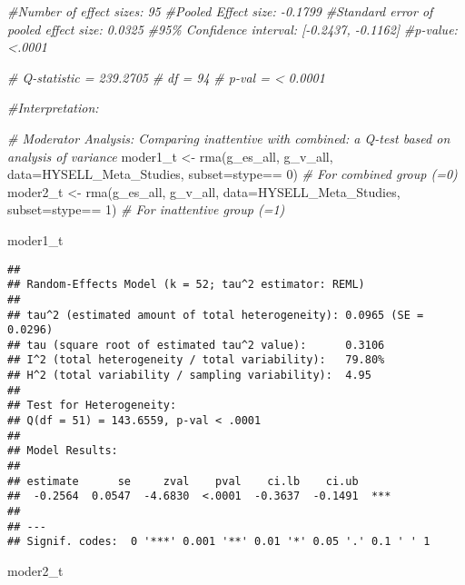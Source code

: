 \documentclass[
]{book}
\newenvironment{Shaded}{\begin{snugshade}}{\end{snugshade}}
\newcommand{\AttributeTok}[1]{\textcolor[rgb]{0.77,0.63,0.00}{#1}}
\newcommand{\CommentTok}[1]{\textcolor[rgb]{0.56,0.35,0.01}{\textit{#1}}}
\newcommand{\DecValTok}[1]{\textcolor[rgb]{0.00,0.00,0.81}{#1}}
\newcommand{\FunctionTok}[1]{\textcolor[rgb]{0.00,0.00,0.00}{#1}}
\newcommand{\NormalTok}[1]{#1}
\newcommand{\OtherTok}[1]{\textcolor[rgb]{0.56,0.35,0.01}{#1}}
\newcommand{\SpecialCharTok}[1]{\textcolor[rgb]{0.00,0.00,0.00}{#1}}
\begin{document}
\begin{Shaded}
\begin{Highlighting}[]
\CommentTok{\#Number of effect sizes: 95}
\CommentTok{\#Pooled Effect size: {-}0.1799}
\CommentTok{\#Standard error of pooled effect size:  0.0325}
\CommentTok{\#95\% Confidence interval: [{-}0.2437, {-}0.1162]}
\CommentTok{\#p{-}value: \textless{}.0001}

\CommentTok{\# Q{-}statistic = 239.2705}
\CommentTok{\# df = 94}
\CommentTok{\# p{-}val = \textless{} 0.0001}

\CommentTok{\#Interpretation: }



\CommentTok{\# Moderator Analysis: Comparing inattentive with combined: a Q{-}test based on analysis of variance}
\NormalTok{moder1\_t }\OtherTok{\textless{}{-}} \FunctionTok{rma}\NormalTok{(g\_es\_all, g\_v\_all, }\AttributeTok{data=}\NormalTok{HYSELL\_Meta\_Studies, }\AttributeTok{subset=}\NormalTok{stype}\SpecialCharTok{==} \DecValTok{0}\NormalTok{) }\CommentTok{\# For combined group (=0)}
\NormalTok{moder2\_t }\OtherTok{\textless{}{-}} \FunctionTok{rma}\NormalTok{(g\_es\_all, g\_v\_all, }\AttributeTok{data=}\NormalTok{HYSELL\_Meta\_Studies, }\AttributeTok{subset=}\NormalTok{stype}\SpecialCharTok{==} \DecValTok{1}\NormalTok{) }\CommentTok{\# For inattentive group (=1)}


\NormalTok{moder1\_t }
\end{Highlighting}
\end{Shaded}

\begin{verbatim}
## 
## Random-Effects Model (k = 52; tau^2 estimator: REML)
## 
## tau^2 (estimated amount of total heterogeneity): 0.0965 (SE = 0.0296)
## tau (square root of estimated tau^2 value):      0.3106
## I^2 (total heterogeneity / total variability):   79.80%
## H^2 (total variability / sampling variability):  4.95
## 
## Test for Heterogeneity:
## Q(df = 51) = 143.6559, p-val < .0001
## 
## Model Results:
## 
## estimate      se     zval    pval    ci.lb    ci.ub      
##  -0.2564  0.0547  -4.6830  <.0001  -0.3637  -0.1491  *** 
## 
## ---
## Signif. codes:  0 '***' 0.001 '**' 0.01 '*' 0.05 '.' 0.1 ' ' 1
\end{verbatim}

\begin{Shaded}
\begin{Highlighting}[]
\NormalTok{moder2\_t }
\end{Highlighting}
\end{Shaded}
\end{document}
